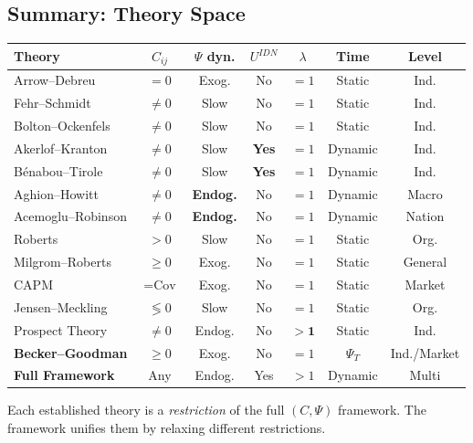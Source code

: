 \subsection{Summary: Theory Space}
\label{app:theoryspace}

\begin{center}
\renewcommand{\arraystretch}{1.3}
\small
\begin{tabular}{lcccccc}
\hline
\textbf{Theory} & $C_{ij}$ & $\Psi$ dyn. & $U^{IDN}$ & $\lambda$ & Time & Level \\
\hline
Arrow--Debreu & $= 0$ & Exog. & No & $= 1$ & Static & Ind. \\
Fehr--Schmidt & $\neq 0$ & Slow & No & $= 1$ & Static & Ind. \\
Bolton--Ockenfels & $\neq 0$ & Slow & No & $= 1$ & Static & Ind. \\
Akerlof--Kranton & $\neq 0$ & Slow & \textbf{Yes} & $= 1$ & Dynamic & Ind. \\
Bénabou--Tirole & $\neq 0$ & Slow & \textbf{Yes} & $= 1$ & Dynamic & Ind. \\
Aghion--Howitt & $\neq 0$ & \textbf{Endog.} & No & $= 1$ & Dynamic & Macro \\
Acemoglu--Robinson & $\neq 0$ & \textbf{Endog.} & No & $= 1$ & Dynamic & Nation \\
Roberts & $> 0$ & Slow & No & $= 1$ & Static & Org. \\
Milgrom--Roberts & $\geq 0$ & Exog. & No & $= 1$ & Static & General \\
CAPM & $= \text{Cov}$ & Exog. & No & $= 1$ & Static & Market \\
Jensen--Meckling & $\lessgtr 0$ & Slow & No & $= 1$ & Static & Org. \\
Prospect Theory & $\neq 0$ & Endog. & No & $\mathbf{> 1}$ & Static & Ind. \\
\textbf{Becker--Goodman} & $\geq 0$ & Exog. & No & $= 1$ & \textbf{$\Psi_T$} & Ind./Market \\
\hline
\textbf{Full Framework} & Any & Endog. & Yes & $> 1$ & Dynamic & Multi \\
\hline
\end{tabular}
\end{center}

Each established theory is a \emph{restriction} of the full $(C, \Psi)$ framework.
The framework unifies them by relaxing different restrictions.

